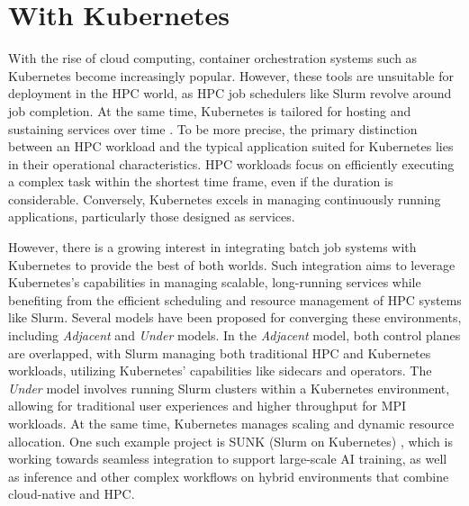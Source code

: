 \section{With Kubernetes}

With the rise of cloud computing, container orchestration systems such as Kubernetes become increasingly popular. However, these tools are unsuitable for deployment in the HPC world, as HPC job schedulers like Slurm revolve around job completion. At the same time, Kubernetes is tailored for hosting and sustaining services over time \cite{9235080}. To be more precise, the primary distinction between an HPC workload and the typical application suited for Kubernetes lies in their operational characteristics. HPC workloads focus on efficiently executing a complex task within the shortest time frame, even if the duration is considerable. Conversely, Kubernetes excels in managing continuously running applications, particularly those designed as services.

However, there is a growing interest in integrating batch job systems with Kubernetes to provide the best of both worlds. Such integration aims to leverage Kubernetes's capabilities in managing scalable, long-running services while benefiting from the efficient scheduling and resource management of HPC systems like Slurm. Several models have been proposed for converging these environments, including \textit{Adjacent} and \textit{Under} models. In the \textit{Adjacent} model, both control planes are overlapped, with Slurm managing both traditional HPC and Kubernetes workloads, utilizing Kubernetes' capabilities like sidecars and operators. The \textit{Under} model involves running Slurm clusters within a Kubernetes environment, allowing for traditional user experiences and higher throughput for MPI workloads. At the same time, Kubernetes manages scaling and dynamic resource allocation. One such example project is SUNK (Slurm on Kubernetes) \cite{SlurmK8sIntegration}, which is working towards seamless integration to support large-scale AI training, as well as inference and other complex workflows on hybrid environments that combine cloud-native and HPC.